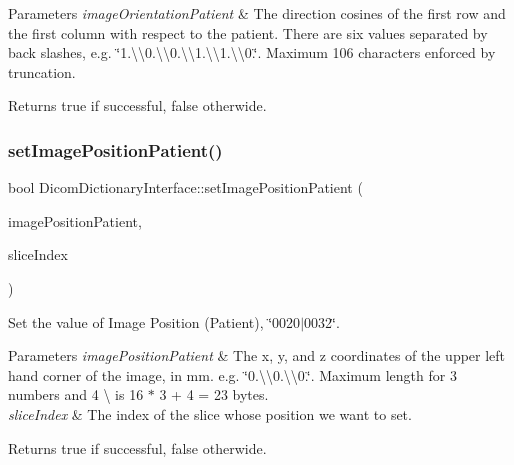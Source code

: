 \begin{DoxyParams}{Parameters}
{\em image\+Orientation\+Patient} & The direction cosines of the first row and the first column with respect to the patient. There are six values separated by back slashes, e.\+g. \char`\"{}1.\textbackslash{}\textbackslash{}0.\textbackslash{}\textbackslash{}0.\textbackslash{}\textbackslash{}1.\textbackslash{}\textbackslash{}1.\textbackslash{}\textbackslash{}0.\char`\"{}. Maximum 106 characters enforced by truncation. \\
\hline
\end{DoxyParams}
\begin{DoxyReturn}{Returns}
true if successful, false otherwide. 
\end{DoxyReturn}
\mbox{\label{class_dicom_dictionary_interface_a451997eeb35ef9011b23d8800fe9ce3e}} 
\subsubsection{\texorpdfstring{set\+Image\+Position\+Patient()}{setImagePositionPatient()}}
{\footnotesize\ttfamily bool Dicom\+Dictionary\+Interface\+::set\+Image\+Position\+Patient (\begin{DoxyParamCaption}\item[{Q\+String}]{image\+Position\+Patient,  }\item[{\hyperlink{class_dicom_dictionary_interface_a4fde43e0647ab57f29eb2c59c3d051ca}{Dicom\+Dictionary\+Interface\+::\+Size\+Type}}]{slice\+Index }\end{DoxyParamCaption})}



Set the value of Image Position (Patient), \char`\"{}0020$\vert$0032\char`\"{}. 


\begin{DoxyParams}{Parameters}
{\em image\+Position\+Patient} & The x, y, and z coordinates of the upper left hand corner of the image, in mm. e.\+g. \char`\"{}0.\textbackslash{}\textbackslash{}0.\textbackslash{}\textbackslash{}0.\char`\"{}. Maximum length for 3 numbers and 4 \textquotesingle{}\textbackslash{}\textquotesingle{} is 16 $\ast$ 3 + 4 = 23 bytes. \\
\hline
{\em slice\+Index} & The index of the slice whose position we want to set. \\
\hline
\end{DoxyParams}
\begin{DoxyReturn}{Returns}
true if successful, false otherwide. 
\end{DoxyReturn}
\mbox{\label{class_dicom_dictionary_interface_a6c30ad45495e7739ceaabf866f6147e1}} 
